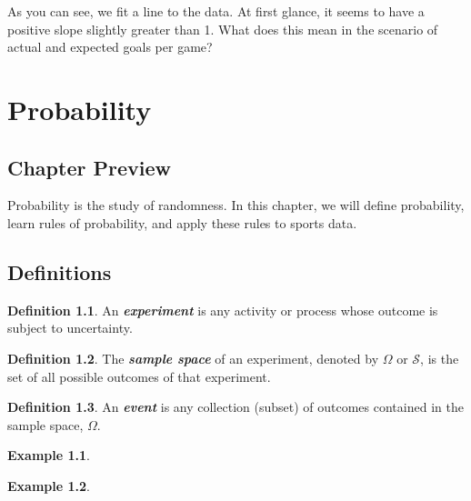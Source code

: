\documentclass[
  11pt,
]{book}
\theoremstyle{definition}
\newtheorem{definition}{Definition}[chapter]
\theoremstyle{definition}
\newtheorem{example}{Example}[chapter]
\theoremstyle{definition}
\theoremstyle{definition}
\theoremstyle{remark}
\begin{document}
As you can see, we fit a line to the data. At first glance, it seems to have a positive slope slightly greater than 1. What does this mean in the scenario of actual and expected goals per game?

\hypertarget{probability}{%
\chapter{Probability}\label{probability}}

\hypertarget{chapter-preview}{%
\section*{Chapter Preview}\label{chapter-preview}}

Probability is the study of randomness. In this chapter, we will define probability, learn rules of probability, and apply these rules to sports data.

\hypertarget{definitions-1}{%
\section{Definitions}\label{definitions-1}}

\begin{definition}
An \textbf{\emph{experiment}} is any activity or process whose outcome is subject to uncertainty.
\end{definition}

\begin{definition}
The \textbf{\emph{sample space}} of an experiment, denoted by \(\Omega\) or \(\mathcal{S}\), is the set of all possible outcomes of that experiment.
\end{definition}

\begin{definition}
An \textbf{\emph{event}} is any collection (subset) of outcomes contained in the sample space, \(\Omega\).
\end{definition}

\begin{example}
\[ \]
\end{example}

\hfill\break
\hfill\break
\hfill\break
\hfill\break
\hfill\break

\begin{example}
\[ \]
\end{example}

~\\
\strut \\
\strut \\
\strut \\
\end{document}
